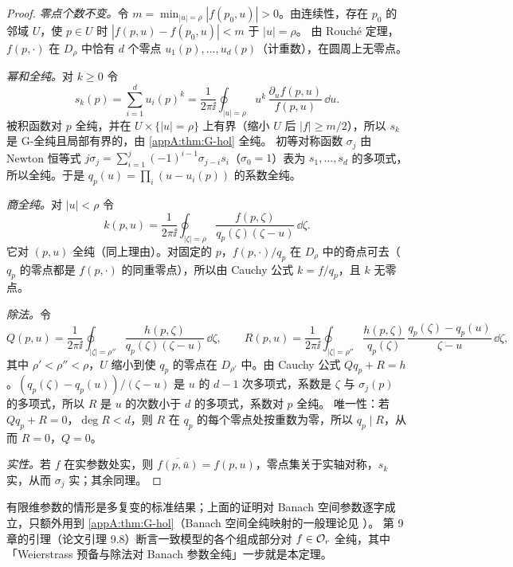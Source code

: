 \begin{proof}
\emph{零点个数不变。}令 $m=\min_{|u|=\rho}|f(p_0,u)|>0$。由连续性，存在 $p_0$ 的邻域 $U$，使 $p\in U$ 时 $|f(p,u)-f(p_0,u)|<m$ 于 $|u|=\rho$。
由 Rouché 定理，$f(p,\cdot)$ 在 $D_\rho$ 中恰有 $d$ 个零点 $u_1(p),\dots,u_d(p)$（计重数），在圆周上无零点。

\emph{幂和全纯。}对 $k\ge0$ 令
\[
  s_k(p)=\sum_{i=1}^du_i(p)^k=\frac1{2\pi\ii}\oint_{|u|=\rho}u^k\,\frac{\partial_uf(p,u)}{f(p,u)}\,\dd u .
\]
被积函数对 $p$ 全纯，并在 $U\times\{|u|=\rho\}$ 上有界（缩小 $U$ 后 $|f|\ge m/2$），所以 $s_k$ 是 G-全纯且局部有界的，由 \cref{appA:thm:G-hol} 全纯。
初等对称函数 $\sigma_j$ 由 Newton 恒等式 $j\sigma_j=\sum_{i=1}^j(-1)^{i-1}\sigma_{j-i}s_i$（$\sigma_0=1$）表为 $s_1,\dots,s_d$ 的多项式，所以全纯。于是 $q_p(u)=\prod_i(u-u_i(p))$ 的系数全纯。

\emph{商全纯。}对 $|u|<\rho$ 令
\[
  k(p,u)=\frac1{2\pi\ii}\oint_{|\zeta|=\rho}\frac{f(p,\zeta)}{q_p(\zeta)(\zeta-u)}\,\dd\zeta .
\]
它对 $(p,u)$ 全纯（同上理由）。对固定的 $p$，$f(p,\cdot)/q_p$ 在 $D_\rho$ 中的奇点可去（$q_p$ 的零点都是 $f(p,\cdot)$ 的同重零点），所以由 Cauchy 公式 $k=f/q_p$，且 $k$ 无零点。

\emph{除法。}令
\[
  Q(p,u)=\frac1{2\pi\ii}\oint_{|\zeta|=\rho''}\frac{h(p,\zeta)}{q_p(\zeta)(\zeta-u)}\,\dd\zeta,\qquad
  R(p,u)=\frac1{2\pi\ii}\oint_{|\zeta|=\rho''}\frac{h(p,\zeta)}{q_p(\zeta)}\,\frac{q_p(\zeta)-q_p(u)}{\zeta-u}\,\dd\zeta ,
\]
其中 $\rho'<\rho''<\rho$，$U$ 缩小到使 $q_p$ 的零点在 $D_{\rho'}$ 中。由 Cauchy 公式 $Qq_p+R=h$。$(q_p(\zeta)-q_p(u))/(\zeta-u)$ 是 $u$ 的 $d-1$ 次多项式，系数是 $\zeta$ 与 $\sigma_j(p)$ 的多项式，所以 $R$ 是 $u$ 的次数小于 $d$ 的多项式，系数对 $p$ 全纯。
唯一性：若 $Qq_p+R=0$，$\deg R<d$，则 $R$ 在 $q_p$ 的每个零点处按重数为零，所以 $q_p\mid R$，从而 $R=0$，$Q=0$。

\emph{实性。}若 $f$ 在实参数处实，则 $\overline{f(p,\bar u)}=f(p,u)$，零点集关于实轴对称，$s_k$ 实，从而 $\sigma_j$ 实；其余同理。
\end{proof}

\begin{remark}\label{appA:rem:weierstrass-refs}
有限维参数的情形是多复变的标准结果；上面的证明对 Banach 空间参数逐字成立，只额外用到 \cref{appA:thm:G-hol}（Banach 空间全纯映射的一般理论见 \cite{Mujica1986}）。
第 9 章的引理（论文引理 9.8）断言一致模型的各个组成部分对 $f\in\mathcal O_r$ 全纯，其中「Weierstrass 预备与除法对 Banach 参数全纯」一步就是本定理。
\end{remark}

